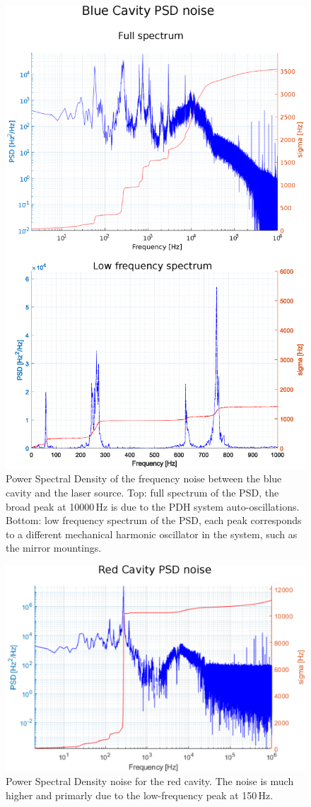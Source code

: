 \begin{figure}
	\centering
	\includegraphics[width=0.9\linewidth]{images/PSD.eps}
	\caption{Power Spectral Density of the frequency noise between the blue cavity and the laser source. Top: full spectrum of the PSD, the broad peak at 10000\,Hz is due to the PDH system auto-oscillations. Bottom: low frequency spectrum of the PSD, each peak corresponds to a different mechanical harmonic oscillator in the system, such as the mirror mountings.}
	\label{fig:PSD}
\end{figure}
\begin{figure}
	\centering
	\includegraphics[width=0.9\linewidth]{images/rossabroad.eps}
	\caption{Power Spectral Density noise for the red cavity. The noise is much higher and primarly due to the low-frequency peak at 150\,Hz.}
	\label{fig:rossabroad}
\end{figure}

